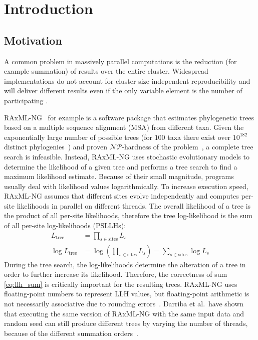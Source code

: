 \chapter{Introduction}
\label{ch:Introduction}

\section{Motivation}
\label{sec:Motivation}
A common problem in massively parallel computations is the reduction (for example summation) of results over the entire cluster.
Widespread implementations do not account for cluster-size-independent reproducibility and will deliver different results
even if the only variable element is the number of participating .

RAxML-NG~\cite{kozlov_raxml-ng_2019-1} for example is a software package that estimates phylogenetic trees based on a multiple sequence alignment (MSA) from different taxa.
Given the exponentially large number of possible trees (for $100$ taxa there exist over $10^{182}$ distinct phylogenies~\cite{stamatakis_efficient_2020}) and proven $\mathcal{NP}$-hardness of the problem~\cite{roch_short_2006}, a complete tree search is infeasible.
Instead, RAxML-NG uses stochastic evolutionary models to determine the likelihood of a given tree and performs a tree search to find a maximum likelihood estimate.
Because of their small magnitude, programs usually deal with likelihood values logarithmically.
To increase execution speed, RAxML-NG assumes that different sites evolve independently and computes per-site likelihoods in parallel on different threads.
The overall likelihood of a tree is the product of all per-site likelihoods, therefore the tree log-likelihood is the sum of all per-site log-likelihoods (PSLLHs):
\begin{align}
L_{\textrm{tree}} &= \prod_{s \in \textrm{sites}} L_s \\
\label{eq:llh_sum}
\log L_{\textrm{tree}} &= \log (\prod_{s \in \textrm{sites}} L_s) = \sum_{s \in \textrm{sites}}  \log L_s
\end{align}
During the tree search, the log-likelihoods determine the alteration of a tree in order to further increase its likelihood.
Therefore, the correctness of sum \eqref{eq:llh_sum} is critically important for the resulting trees.
RAxML-NG uses floating-point numbers to represent LLH values, but floating-point arithmetic is not necessarily associative due to rounding errors~\cite{goldberg_what_1991}.
Darriba et al.\ have shown that executing the same version of RAxML-NG with the same input data and random seed can still produce different trees by varying the number of threads, because of the different summation orders~\cite{darriba_state_2018}.
